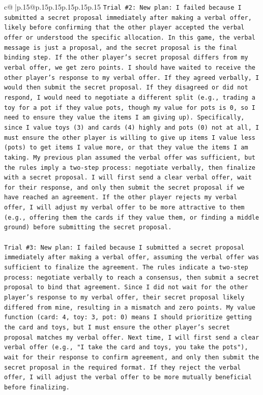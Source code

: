 \documentclass{article}
\begin{document}
{\begin{supertabular}{c@{$\;$}|p{.15\linewidth}@{}p{.15\linewidth}p{.15\linewidth}p{.15\linewidth}p{.15\linewidth}p{.15\linewidth}}
{{{\texttt{Trial \#2: New plan: I failed because I submitted a secret proposal immediately after making a verbal offer, likely before confirming that the other player accepted the verbal offer or understood the specific allocation. In this game, the verbal message is just a proposal, and the secret proposal is the final binding step. If the other player's secret proposal differs from my verbal offer, we get zero points. I should have waited to receive the other player's response to my verbal offer. If they agreed verbally, I would then submit the secret proposal. If they disagreed or did not respond, I would need to negotiate a different split (e.g., trading a toy for a pot if they value pots, though my value for pots is 0, so I need to ensure they value the items I am giving up). Specifically, since I value toys (3) and cards (4) highly and pots (0) not at all, I must ensure the other player is willing to give up items I value less (pots) to get items I value more, or that they value the items I am taking. My previous plan assumed the verbal offer was sufficient, but the rules imply a two{-}step process: negotiate verbally, then finalize with a secret proposal. I will first send a clear verbal offer, wait for their response, and only then submit the secret proposal if we have reached an agreement. If the other player rejects my verbal offer, I will adjust my verbal offer to be more attractive to them (e.g., offering them the cards if they value them, or finding a middle ground) before submitting the secret proposal.} \\
\\ 
\texttt{Trial \#3: New plan: I failed because I submitted a secret proposal immediately after making a verbal offer, assuming the verbal offer was sufficient to finalize the agreement. The rules indicate a two{-}step process: negotiate verbally to reach a consensus, then submit a secret proposal to bind that agreement. Since I did not wait for the other player's response to my verbal offer, their secret proposal likely differed from mine, resulting in a mismatch and zero points. My value function (card: 4, toy: 3, pot: 0) means I should prioritize getting the card and toys, but I must ensure the other player's secret proposal matches my verbal offer. Next time, I will first send a clear verbal offer (e.g., "I take the card and toys, you take the pots"), wait for their response to confirm agreement, and only then submit the secret proposal in the required format. If they reject the verbal offer, I will adjust the verbal offer to be more mutually beneficial before finalizing.} \\
}}}
\end{supertabular}}
\end{document}

